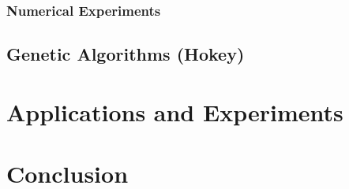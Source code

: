 \documentclass[11pt,reqno]{amsart}
\theoremstyle{definition}
\theoremstyle{remark}
\begin{document}
\subsubsection{Numerical Experiments}



\subsection{Genetic Algorithms (Hokey)} %
\label{sub:genetic_algorithms_}


\section{Applications and Experiments} %
\label{sec:applications_}


\section{Conclusion} %
\label{sec:conclusion}





\end{document}
